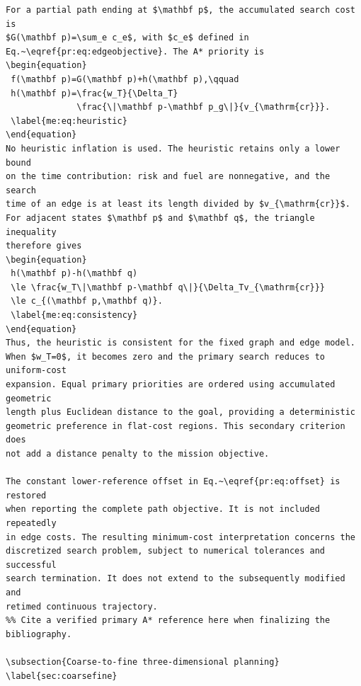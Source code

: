 \documentclass[12pt]{article}
\begin{document}
\begin{verbatim}
For a partial path ending at $\mathbf p$, the accumulated search cost is
$G(\mathbf p)=\sum_e c_e$, with $c_e$ defined in
Eq.~\eqref{pr:eq:edgeobjective}. The A* priority is
\begin{equation}
 f(\mathbf p)=G(\mathbf p)+h(\mathbf p),\qquad
 h(\mathbf p)=\frac{w_T}{\Delta_T}
              \frac{\|\mathbf p-\mathbf p_g\|}{v_{\mathrm{cr}}}.
 \label{me:eq:heuristic}
\end{equation}
No heuristic inflation is used. The heuristic retains only a lower bound
on the time contribution: risk and fuel are nonnegative, and the search
time of an edge is at least its length divided by $v_{\mathrm{cr}}$.
For adjacent states $\mathbf p$ and $\mathbf q$, the triangle inequality
therefore gives
\begin{equation}
 h(\mathbf p)-h(\mathbf q)
 \le \frac{w_T\|\mathbf p-\mathbf q\|}{\Delta_Tv_{\mathrm{cr}}}
 \le c_{(\mathbf p,\mathbf q)}.
 \label{me:eq:consistency}
\end{equation}
Thus, the heuristic is consistent for the fixed graph and edge model.
When $w_T=0$, it becomes zero and the primary search reduces to uniform-cost
expansion. Equal primary priorities are ordered using accumulated geometric
length plus Euclidean distance to the goal, providing a deterministic
geometric preference in flat-cost regions. This secondary criterion does
not add a distance penalty to the mission objective.

The constant lower-reference offset in Eq.~\eqref{pr:eq:offset} is restored
when reporting the complete path objective. It is not included repeatedly
in edge costs. The resulting minimum-cost interpretation concerns the
discretized search problem, subject to numerical tolerances and successful
search termination. It does not extend to the subsequently modified and
retimed continuous trajectory.
%% Cite a verified primary A* reference here when finalizing the bibliography.

\subsection{Coarse-to-fine three-dimensional planning}
\label{sec:coarsefine}


\end{verbatim}
\end{document}
